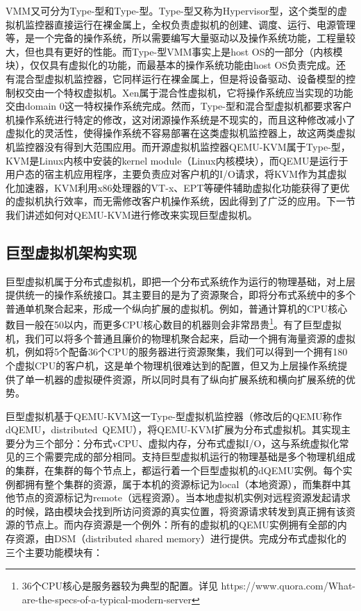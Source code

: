 VMM又可分为Type-\uppercase\expandafter{}型和Type-\uppercase\expandafter{}型。Type-\uppercase\expandafter{}型又称为Hypervisor型，这个类型的虚拟机监控器直接运行在裸金属上，全权负责虚拟机的创建、调度、运行、电源管理等，是一个完备的操作系统，所以需要编写大量驱动以及操作系统功能，工程量较大，但也具有更好的性能。而Type-\uppercase\expandafter{}型VMM事实上是host OS的一部分（内核模块），仅仅具有虚拟化的功能，而最基本的操作系统功能由host OS负责完成。还有混合型虚拟机监控器，它同样运行在裸金属上，但是将设备驱动、设备模型的控制权交由一个特权虚拟机。Xen属于混合性虚拟机，它将操作系统应当实现的功能交由domain 0这一特权操作系统完成。然而，Type-\uppercase\expandafter{}型和混合型虚拟机都要求客户机操作系统进行特定的修改，这对闭源操作系统是不现实的，而且这种修改减小了虚拟化的灵活性，使得操作系统不容易部署在这类虚拟机监控器上，故这两类虚拟机监控器没有得到大范围应用。而开源虚拟机监控器QEMU-KVM属于Type-\uppercase\expandafter{}型，KVM\cite{KVM}是Linux内核中安装的kernel module（Linux内核模块），而QEMU\cite{QEMU}是运行于用户态的宿主机应用程序，主要负责应对客户机的I/O请求，将KVM作为其虚拟化加速器，KVM利用x86处理器的VT-x、EPT等硬件辅助虚拟化功能获得了更优的虚拟机执行效率，而无需修改客户机操作系统，因此得到了广泛的应用。下一节我们讲述如何对QEMU-KVM进行修改来实现巨型虚拟机。

\subsection{巨型虚拟机架构实现}
巨型虚拟机属于分布式虚拟机，即把一个分布式系统作为运行的物理基础，对上层提供统一的操作系统接口。其主要目的是为了资源聚合，即将分布式系统中的多个普通单机聚合起来，形成一个纵向扩展的虚拟机。例如，普通计算机的CPU核心数目一般在50以内，而更多CPU核心数目的机器则会非常昂贵\footnote{36个CPU核心是服务器较为典型的配置。详见 https://www.quora.com/What-are-the-specs-of-a-typical-modern-server}。有了巨型虚拟机，我们可以将多个普通且廉价的物理机聚合起来，启动一个拥有海量资源的虚拟机，例如将5个配备36个CPU的服务器进行资源聚集，我们可以得到一个拥有180个虚拟CPU的客户机，这是单个物理机很难达到的配置，但又为上层操作系统提供了单一机器的虚拟硬件资源，所以同时具有了纵向扩展系统和横向扩展系统的优势。

巨型虚拟机基于QEMU-KVM这一Type-\uppercase\expandafter{}型虚拟机监控器（修改后的QEMU称作dQEMU，distributed\ QEMU），将QEMU-KVM扩展为分布式虚拟机。其实现主要分为三个部分：分布式vCPU、虚拟内存，分布式虚拟I/O，这与系统虚拟化常见的三个需要完成的部分相同。支持巨型虚拟机运行的物理基础是多个物理机组成的集群，在集群的每个节点上，都运行着一个巨型虚拟机的dQEMU实例。每个实例都拥有整个集群的资源，属于本机的资源标记为local（本地资源），而集群中其他节点的资源标记为remote（远程资源）。当本地虚拟机实例对远程资源发起请求的时候，路由模块会找到所访问资源的真实位置，将资源请求转发到真正拥有该资源的节点上。而内存资源是一个例外：所有的虚拟机的QEMU实例拥有全部的内存资源，由DSM（distributed shared memory）进行提供。完成分布式虚拟化的三个主要功能模块有：


